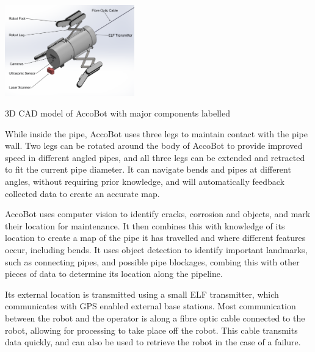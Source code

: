 \documentclass[11pt]{article}		%
\begin{document}
			\begin{floatingfigure}[r]{0.45\textwidth}
			\centering
				\includegraphics[width = 0.42\textwidth]{overviewCADLabels}
				\caption{3D CAD model of AccoBot with major components labelled}
				\label{3DSketch}
			\end{floatingfigure}

			While inside the pipe, AccoBot uses three legs to maintain contact with the pipe wall.
			Two legs can be rotated around the body of AccoBot to provide improved speed in different angled pipes, and all three legs can be extended and retracted to fit the current pipe diameter.
			It can navigate bends and pipes at different angles, without requiring prior knowledge, and will automatically feedback collected data to create an accurate map.
			
			                        
			\begin{floatingfigure}[r]{0pt} \end{floatingfigure}
					
			AccoBot uses computer vision to identify cracks, corrosion and objects, and mark their location for maintenance.
			It then combines this with knowledge of its location to create a map of the pipe it has travelled and where different features occur, including bends.
			It uses object detection to identify important landmarks, such as connecting pipes, and possible pipe blockages, combing this with other pieces of data to determine its location along the pipeline.
			
			\begin{floatingfigure}[r]{0pt} \end{floatingfigure}
			
			Its external location is transmitted using a small ELF transmitter, which communicates with GPS enabled external base stations. 
			Most communication between the robot and the operator is along a fibre optic cable connected to the robot, allowing for processing to take place off the robot.
			This cable transmits data quickly, and can also be used to retrieve the robot in the case of a failure.
\end{document}
